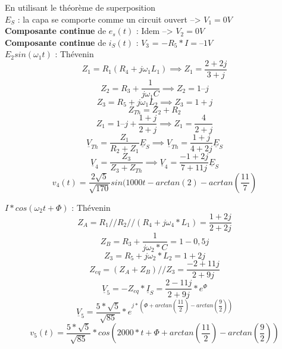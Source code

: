 {En utilisant le théorème de superposition\\
$E_S$ : la capa se comporte comme un circuit ouvert –> $V_1 = 0V$\\
\textbf{Composante continue} de $e_s(t)$ : Idem –> $V_2 = 0V$\\
\textbf{Composante continue} de $i_S(t)$ : $V_3$ = $- R_5 * I = – 1V$\\
$E_2sin(\omega_1t)$ : Thévenin
\begin{equation*}
    Z_1 = R_1 (R_4+j\omega_1L_1) \implies Z_1 = \dfrac{2+2j}{3+j}
\end{equation*}
\begin{equation*}
    Z_2=R_3+\dfrac{1}{j\omega_1C} \implies Z_2 = 1–j
\end{equation*}
\begin{equation*}
    Z_3 = R_5+j\omega_1L_2 \implies Z_3=1+j
\end{equation*}
\begin{equation*}
    Z_{Th} = Z_2 + R_2
\end{equation*}
\begin{equation*}
    Z_1 = 1 – j + \dfrac{1+j}{2+j} \implies Z_1 = \dfrac{4}{2+j}
\end{equation*}
\begin{equation*}
    \underline{V}_{Th} = \dfrac{Z_1}{R_2+Z_1} \underline{E}_S \implies \underline{V}_{Th}= \dfrac{1+j}{4+2j}\underline{E}_S
\end{equation*}
\begin{equation*}
    \underline{V}_4 = \dfrac{Z_3}{Z_3+Z_{Th}} \implies \underline{V}_4=\dfrac{-1+2j}{7+11j}\underline{E}_S
\end{equation*}
\begin{equation*}
    v_4(t) = \dfrac{2\sqrt{5}}{\sqrt{170}}sin(1000t - arctan(2)-acrtan\left(\dfrac{11}{7}\right)
\end{equation*}

$I*cos(\omega_2t + \Phi)$ : Thévenin
\begin{equation*}
    Z_A = R_1//R_2//(R_4 + j\omega_4*L_1) = \dfrac{1+2j}{2+2j}
\end{equation*}
\begin{equation*}
    Z_B = R_3 + \dfrac{1}{j\omega_2*C}=1-0,5j
\end{equation*}
\begin{equation*}
    Z_3= R_5 +j\omega_2*L_2 = 1+2j
\end{equation*}
\begin{equation*}
    Z_{eq} = (Z_A + Z_B)//Z_3 = \dfrac{-2+11j}{2+9j}
\end{equation*}
\begin{equation*}
    \underline{V}_5 = -Z_{eq}*\underline{I}_S = \dfrac{2-11j}{2+9j}*e^{\Phi} 
\end{equation*}
\begin{equation*}
    \underline{V}_{5} = \dfrac{5*\sqrt{5}}{\sqrt{85}}*e^{j*\left(\Phi + arctan(\dfrac{11}{2}) - arctan(\dfrac{9}{2})\right)}
\end{equation*}
\begin{equation*}
    v_5(t) = \dfrac{5*\sqrt{5}}{\sqrt{85}}*cos\left(2000*t+\Phi+ arctan(\dfrac{11}{2}) - arctan(\dfrac{9}{2})\right)
\end{equation*}

}
